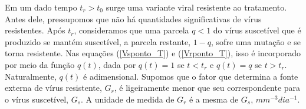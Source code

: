 Em um dado tempo \( t_{ r } > t_{ 0 } \) surge uma variante viral resistente ao tratamento.
Antes dele, pressupomos que não há quantidades significativas de vírus resistentes.
Após \( t_{ r } \), consideramos que uma parcela \( q < 1 \) do vírus suscetível que é produzido se mantém suscetível, a parcela restante, \( 1 - q \), sofre uma mutação e se torna resistente.
Nas equações (\ref{Vsponto_T}) e (\ref{Vrponto_T}), isso é incorporado por meio da função \( q ( t ) \), dada por \( q ( t ) = 1 \) se \( t < t_{ r } \) e \( q ( t ) = q \) se \( t > t_{ r } \).
Naturalmente, \( q ( t ) \) é adimensional.
Supomos que o fator que determina a fonte externa de vírus resistente, \( G_{ r } \), é ligeiramente menor que seu correspondente para o vírus suscetível, \( G_{ s } \).
A unidade de medida de \( G_{ r } \) é a mesma de \( G_{ s } \), \( \unit{mm^{ -3 }dia^{ -1 }} \).

